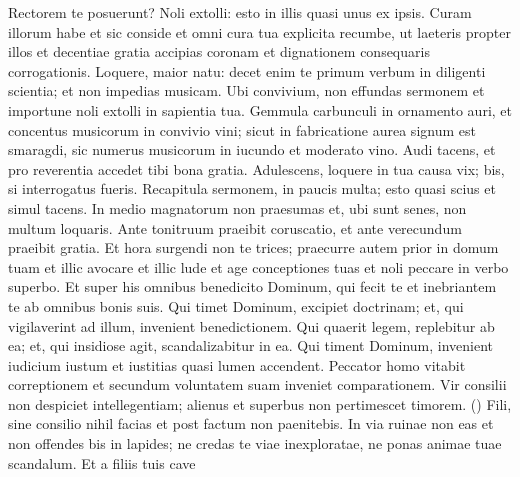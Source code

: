 \begin{biblechapter}
\begin{biblechapter}
\begin{biblechapter}
\begin{biblechapter}
\begin{biblechapter}
\begin{biblechapter}
\begin{biblechapter}
\begin{biblechapter}
\begin{biblechapter}
\begin{biblechapter}
\begin{biblechapter}
\begin{biblechapter}
\begin{biblechapter}
\begin{biblechapter}
\begin{biblechapter}
\begin{biblechapter}
\begin{biblechapter}
\begin{biblechapter}
\begin{biblechapter}
\begin{biblechapter}
\begin{biblechapter}
\begin{biblechapter}
\begin{biblechapter}
\begin{biblechapter}
\begin{biblechapter}
\begin{biblechapter}
\begin{biblechapter}
\begin{biblechapter}
\begin{biblechapter}
\begin{biblechapter}
\begin{biblechapter}
\begin{biblechapter}
\verse Rectorem te posuerunt? Noli extolli:
 esto in illis quasi unus ex ipsis.
 \verse Curam illorum habe et sic conside
 et omni cura tua explicita recumbe,
 \verse ut laeteris propter illos
 et decentiae gratia accipias coronam
 et dignationem consequaris corrogationis.
 \verse Loquere, maior natu: decet enim te
 \verse primum verbum in diligenti scientia;
 et non impedias musicam.
 \verse Ubi convivium, non effundas sermonem
 et importune noli extolli in sapientia tua.
 \verse Gemmula carbunculi in ornamento auri,
 et concentus musicorum in convivio vini;
 \verse sicut in fabricatione aurea signum est smaragdi,
 sic numerus musicorum in iucundo et moderato vino.
 \verse Audi tacens, et pro reverentia accedet tibi bona gratia.
 \verse Adulescens, loquere in tua causa vix;
 \verse bis, si interrogatus fueris.
 \verse Recapitula sermonem, in paucis multa;
 esto quasi scius et simul tacens.
 \verse In medio magnatorum non praesumas
 et, ubi sunt senes, non multum loquaris.
 \verse Ante tonitruum praeibit coruscatio,
 et ante verecundum praeibit gratia.
 \verse Et hora surgendi non te trices;
 praecurre autem prior in domum tuam
 et illic avocare et illic lude
 \verse et age conceptiones tuas
 et noli peccare in verbo superbo.
 \verse Et super his omnibus benedicito Dominum, qui fecit te
 et inebriantem te ab omnibus bonis suis.
 \verse Qui timet Dominum, excipiet doctrinam;
 et, qui vigilaverint ad illum, invenient benedictionem.
 \verse Qui quaerit legem, replebitur ab ea; et, qui insidiose agit, scandalizabitur in ea.
 \verse Qui timent Dominum, invenient iudicium iustum
 et iustitias quasi lumen accendent.
 \verse Peccator homo vitabit correptionem
 et secundum voluntatem suam inveniet comparationem.
 \verse Vir consilii non despiciet intellegentiam;
 alienus et superbus non pertimescet timorem. (\verse)
 \verse Fili, sine consilio nihil facias
 et post factum non paenitebis.
 \verse In via ruinae non eas
 et non offendes bis in lapides;
 ne credas te viae inexploratae,
 ne ponas animae tuae scandalum.
 \verse Et a filiis tuis cave

\end{biblechapter}
\end{biblechapter}
\end{biblechapter}
\end{biblechapter}
\end{biblechapter}
\end{biblechapter}
\end{biblechapter}
\end{biblechapter}
\end{biblechapter}
\end{biblechapter}
\end{biblechapter}
\end{biblechapter}
\end{biblechapter}
\end{biblechapter}
\end{biblechapter}
\end{biblechapter}
\end{biblechapter}
\end{biblechapter}
\end{biblechapter}
\end{biblechapter}
\end{biblechapter}
\end{biblechapter}
\end{biblechapter}
\end{biblechapter}
\end{biblechapter}
\end{biblechapter}
\end{biblechapter}
\end{biblechapter}
\end{biblechapter}
\end{biblechapter}
\end{biblechapter}
\end{biblechapter}
